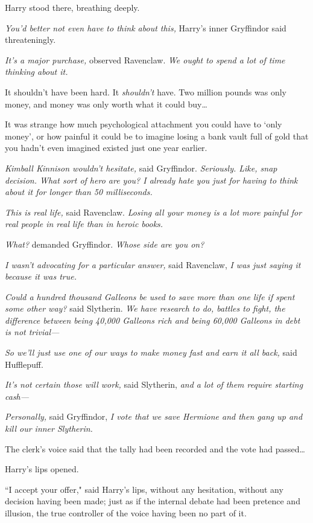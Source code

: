 Harry stood there, breathing deeply.

\emph{You'd better not even have to think about this,} Harry's inner Gryffindor said threateningly.

\emph{It's a major purchase,} observed Ravenclaw. \emph{We ought to spend a lot of time thinking about it.}

It shouldn't have been hard. It \emph{shouldn't} have. Two million pounds was only money, and money was only worth what it could buy{\ldots}

It was strange how much psychological attachment you could have to `only money', or how painful it could be to imagine losing a bank vault full of gold that you hadn't even imagined existed just one year earlier.

\emph{Kimball Kinnison wouldn't hesitate,} said Gryffindor. \emph{Seriously. Like, snap decision. What sort of hero are you? I already hate you just for having to think about it for longer than 50 milliseconds.}

\emph{This is real life,} said Ravenclaw. \emph{Losing all your money is a lot more painful for real people in real life than in heroic books.}

\emph{What?} demanded Gryffindor. \emph{Whose side are you on?}

\emph{I wasn't advocating for a particular answer,} said Ravenclaw, \emph{I was just saying it because it was true.}

\emph{Could a hundred thousand Galleons be used to save more than one life if spent some other way?} said Slytherin. \emph{We have research to do, battles to fight, the difference between being 40,000 Galleons rich and being 60,000 Galleons in debt is not trivial—}

\emph{So we'll just use one of our ways to make money fast and earn it all back,} said Hufflepuff.

\emph{It's not certain those will work,} said Slytherin, \emph{and a lot of them require starting cash—}

\emph{Personally,} said Gryffindor, \emph{I vote that we save Hermione and then gang up and kill our inner Slytherin.}

The clerk's voice said that the tally had been recorded and the vote had passed{\ldots}

Harry's lips opened.

``I accept your offer," said Harry's lips, without any hesitation, without any decision having been made; just as if the internal debate had been pretence and illusion, the true controller of the voice having been no part of it.

